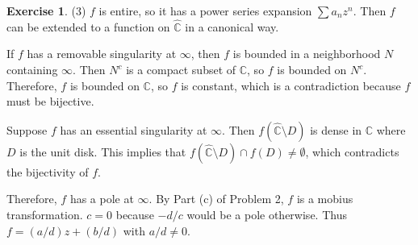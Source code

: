 \documentclass[12pt, psamsfonts]{amsart}
\theoremstyle{definition}
\newtheorem*{exer}{Exercise}
\theoremstyle{remark}
\numberwithin{equation}{section}
\begin{document}
\begin{exer}{(3)}
  $f$ is entire, so it has a power series expansion $\sum a_nz^n$.
  Then $f$ can be extended to a function on $\hat{\mathbb{C}}$ in a canonical way.

  If $f$ has a removable singularity at $\infty$, then $f$ is bounded in a neighborhood $N$ containing $\infty$.
  Then $N^c$ is a compact subset of $\mathbb{C}$, so $f$ is bounded on $N^c$.
  Therefore, $f$ is bounded on $\mathbb{C}$, so $f$ is constant, which is a contradiction because $f$ must be bijective.

  Suppose $f$ has an essential singularity at $\infty$.
  Then $f(\hat{\mathbb{C}} \setminus D)$ is dense in $\mathbb{C}$ where $D$ is the unit disk.
  This implies that $f(\hat{\mathbb{C}} \setminus D) \cap f(D) \ne \emptyset$, which contradicts the bijectivity of $f$.

  Therefore, $f$ has a pole at $\infty$.
  By Part (c) of Problem 2, $f$ is a mobius transformation.
  $c = 0$ because $-d / c$ would be a pole otherwise.
  Thus $f = (a / d)z + (b / d)$ with $a / d \ne 0$.
\end{exer}
\end{document}
